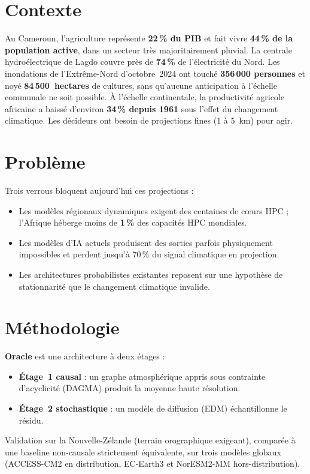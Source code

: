 \documentclass[14pt,a4paper]{extarticle}
\begin{document}
\section*{Contexte}
Au Cameroun, l'agriculture représente \textbf{22\,\% du PIB} et fait vivre \textbf{44\,\% de la population active}, dans un secteur très majoritairement pluvial. La centrale hydroélectrique de Lagdo couvre près de \textbf{74\,\%} de l'électricité du Nord. Les inondations de l'Extrême-Nord d'octobre~2024 ont touché \textbf{356\,000 personnes} et noyé \textbf{84\,500~hectares} de cultures, sans qu'aucune anticipation à l'échelle communale ne soit possible. À l'échelle continentale, la productivité agricole africaine a baissé d'environ \textbf{34\,\% depuis 1961} sous l'effet du changement climatique. Les décideurs ont besoin de projections fines (1 à 5~km) pour agir.

\section*{Problème}
Trois verrous bloquent aujourd'hui ces projections :
\begin{itemize}
    \item Les modèles régionaux dynamiques exigent des centaines de cœurs HPC ; l'Afrique héberge moins de \textbf{1\,\%} des capacités HPC mondiales.
    \item Les modèles d'IA actuels produisent des sorties parfois physiquement impossibles et perdent jusqu'à 70\,\% du signal climatique en projection.
    \item Les architectures probabilistes existantes reposent sur une hypothèse de stationnarité que le changement climatique invalide.
\end{itemize}

\section*{Méthodologie}
\textbf{Oracle} est une architecture à deux étages :
\begin{itemize}
    \item \textbf{Étage~1 causal} : un graphe atmosphérique appris sous contrainte d'acyclicité (DAGMA) produit la moyenne haute résolution.
    \item \textbf{Étage~2 stochastique} : un modèle de diffusion (EDM) échantillonne le résidu.
\end{itemize}
Validation sur la Nouvelle-Zélande (terrain orographique exigeant), comparée à une baseline non-causale strictement équivalente, sur trois modèles globaux (ACCESS-CM2 en distribution, EC-Earth3 et NorESM2-MM hors-distribution).
\end{document}

